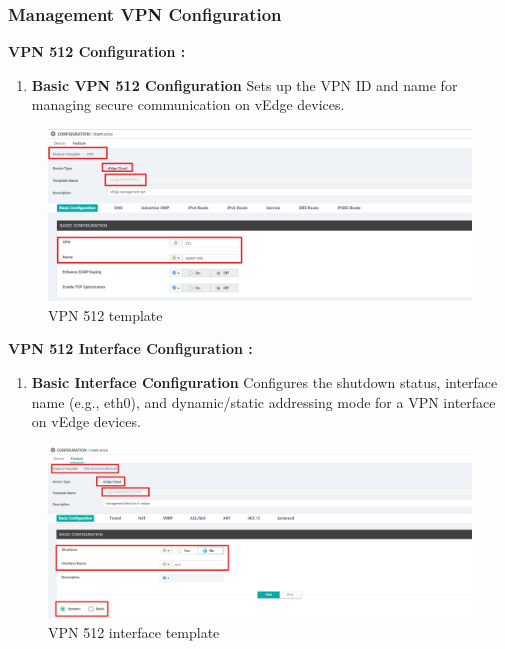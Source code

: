 \documentclass[12pt,english]{report}
\begin{document}
\subsubsection{Management VPN Configuration}
\textbf{VPN 512 Configuration :}
\begin{enumerate}
\item \textbf{Basic VPN 512 Configuration}
Sets up the VPN ID and name for managing secure communication on vEdge devices.
\end{enumerate}
\begin{figure}[H]
    \centering
    \includegraphics[width= 1.1 \textwidth]{chapitre 3/template/8.png}
    \caption{VPN 512 template}
    \label{VPN 512 template}
\end{figure}
\textbf{VPN 512 Interface Configuration :}
\begin{enumerate}
\item \textbf{Basic Interface Configuration}
Configures the shutdown status, interface name (e.g., eth0), and dynamic/static addressing mode for a VPN interface on vEdge devices.
\end{enumerate}
\begin{figure}[H]
    \centering
    \includegraphics[width= 1 \textwidth]{chapitre 3/template/9.png}
    \caption{VPN 512 interface template}
    \label{VPN 512 interface template}
\end{figure}
\end{document}
